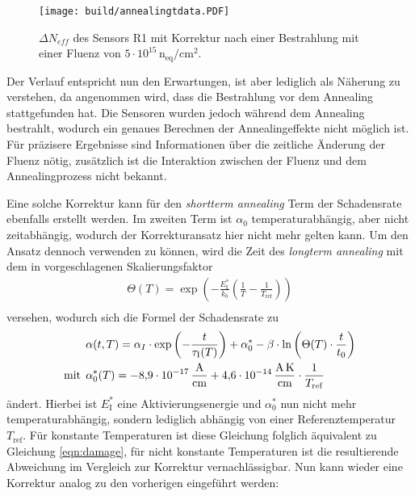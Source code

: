 \begin{figure}[!htb]
  \centering
    \texttt{[image: build/annealingtdata.PDF]}
\caption{$\Delta N_{eff}$ des Sensors R1 mit Korrektur nach einer Bestrahlung mit einer Fluenz von $5\cdot 10^{15} \, \mathrm{n_{eq}/cm^2}$.}
\label{fig:korrektur_N_eff}
\end{figure}



Der Verlauf entspricht nun den Erwartungen, ist aber lediglich als Näherung zu verstehen, da angenommen
wird, dass die Bestrahlung vor dem Annealing stattgefunden hat. Die Sensoren wurden jedoch
während dem Annealing bestrahlt, wodurch ein genaues Berechnen der Annealingeffekte nicht
möglich ist. Für präzisere Ergebnisse sind Informationen über die zeitliche Änderung der Fluenz nötig,
zusätzlich ist die Interaktion zwischen der Fluenz und dem Annealingprozess nicht bekannt.




Eine solche Korrektur kann für den \textit{shortterm annealing} Term der Schadensrate ebenfalls erstellt werden.
Im zweiten Term ist $\alpha_{0}$ temperaturabhängig, aber nicht zeitabhängig,
wodurch der Korrekturansatz hier nicht mehr gelten kann. Um den Ansatz dennoch
verwenden zu können, wird die Zeit des \textit{longterm annealing} mit dem in \cite{moll} vorgeschlagenen
Skalierungsfaktor
\begin{align}
  \Theta(T) =  \exp{\left(-\frac{E_{\mathrm{I}}^*}{k_b}\left(\frac{1}{T}-\frac{1}{T_{\mathrm{ref}}}\right)\right)} \\
\end{align}
versehen, wodurch sich die Formel der Schadensrate  zu
\begin{align}
  &\alpha(t, T) = \alpha_I \cdot \exp{\left(-\frac{t}{\tau_{\mathrm{I}}(T)}\right)} + \alpha_{\mathrm{0}}^{*} -\beta \cdot \ln{\left(\Theta(T) \cdot \frac{t}{t_{\mathrm{0}}}\right)} \\
  \medskip
  \text{mit}\:\: &\alpha^*_{\mathrm{0}}(T) = \SI{-8.9e-17}{\ampere\per\centi\meter} + \SI{4.6e-14}{\ampere\kelvin\per\centi\meter} \cdot \frac{1}{T_{\mathrm{ref}}}
\end{align}
ändert.
Hierbei ist $E_{\mathrm{I}}^*$ eine Aktivierungsenergie und $\alpha^*_{0}$ nun nicht mehr temperaturabhängig,
sondern lediglich abhängig von einer Referenztemperatur $T_{\mathrm{ref}}$. Für konstante Temperaturen
ist diese Gleichung folglich äquivalent zu Gleichung \ref{eqn:damage}, für nicht
konstante Temperaturen ist die resultierende Abweichung im Vergleich zur Korrektur vernachlässigbar.
Nun kann wieder eine Korrektur analog zu den vorherigen eingeführt werden:

